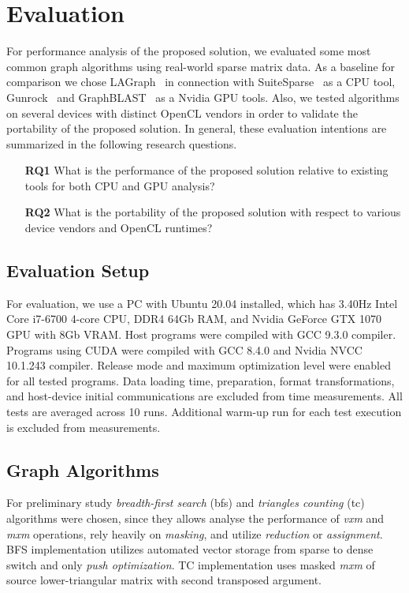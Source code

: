 \section{Evaluation}

For performance analysis of the proposed solution, we evaluated some most common graph algorithms using real-world sparse matrix data. 
As a baseline for comparison we chose LAGraph~\cite{szarnyas2021lagraph} in connection with SuiteSparse~\cite{10.1145/3322125} as a CPU tool, Gunrock~\cite{7967137} and GraphBLAST~\cite{yang2019graphblast} as a Nvidia GPU tools. 
Also, we tested algorithms on several devices with distinct OpenCL vendors in order to validate the portability of the proposed solution. 
In general, these evaluation intentions are summarized in the following research questions. 

\vspace{0.2cm}
\begin{itemize}
    \item[\textbf{RQ1}] What is the performance of the proposed solution relative to existing tools for both CPU and GPU analysis?
    
    \item[\textbf{RQ2}] What is the portability of the proposed solution with respect to various device vendors and OpenCL runtimes?
\end{itemize}

\subsection{Evaluation Setup}

For evaluation, we use a PC with Ubuntu 20.04 installed, which has 3.40Hz Intel Core i7-6700 4-core CPU, DDR4 64Gb RAM, and Nvidia GeForce GTX 1070 GPU with 8Gb VRAM. 
Host programs were compiled with GCC 9.3.0 compiler. Programs using CUDA were compiled with GCC 8.4.0 and Nvidia NVCC 10.1.243 compiler.
Release mode and maximum optimization level were enabled for all tested programs. 
Data loading time, preparation, format transformations, and host-device initial communications are excluded from time measurements. 
All tests are averaged across 10 runs.
Additional warm-up run for each test execution is excluded from measurements.

\subsection{Graph Algorithms}

For preliminary study \textit{breadth-first search} (bfs) and \textit{triangles counting} (tc) algorithms were chosen, since they allows analyse the performance of \textit{vxm} and \textit{mxm} operations, rely heavily on \textit{masking}, and utilize \textit{reduction} or \textit{assignment}. 
BFS implementation utilizes automated vector storage from sparse to dense switch and only \textit{push optimization}. 
TC implementation uses masked \textit{mxm} of source lower-triangular matrix with second transposed argument.

